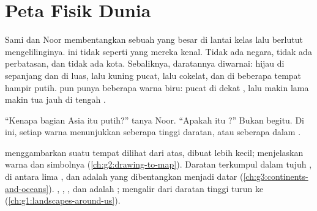 \chapter{Peta Fisik Dunia}\label{ch:g4:world-physical-map}

Sami dan Noor membentangkan sebuah  yang besar di lantai kelas
lalu berlutut mengelilinginya.  ini tidak seperti  yang mereka
kenal. Tidak ada negara, tidak ada perbatasan, dan tidak ada kota.
Sebaliknya, daratannya diwarnai: hijau di sepanjang  dan di
 luas, lalu kuning pucat, lalu cokelat, dan di beberapa
tempat hampir putih.  pun punya beberapa warna biru: pucat di dekat
, lalu makin lama makin tua jauh di tengah .

``Kenapa bagian Asia itu putih?'' tanya Noor. ``Apakah itu ?'' Bukan
begitu. Di  ini, setiap warna menunjukkan seberapa tinggi daratan, atau
seberapa dalam .

\begin{recall}
 menggambarkan suatu tempat dilihat dari atas, dibuat lebih kecil;
 menjelaskan warna dan simbolnya (\cref{ch:g2:drawing-to-map}).
Daratan terkumpul dalam tujuh , di antara lima , dan 
adalah  yang dibentangkan menjadi datar
(\cref{ch:g3:continents-and-oceans}). , , , dan 
adalah ;  mengalir dari daratan tinggi turun ke 
(\cref{ch:g1:landscapes-around-us}).
\end{recall}

